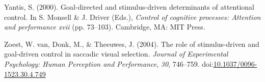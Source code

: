 \documentclass[jou, a4paper, noextraspace,floatsintext]{apa6}
\theoremstyle{definition}
\theoremstyle{definition}
\theoremstyle{definition}
\theoremstyle{remark}
\begin{document}
\hypertarget{ref-Yantis2000}{}
Yantis, S. (2000). Goal-directed and stimulus-driven determinants of
attentional control. In S. Monsell \& J. Driver (Eds.), \emph{Control of
cognitive processes: Attention and performance xvii} (pp. 73--103).
Cambridge, MA: MIT Press.

\hypertarget{ref-VanZoest2004}{}
Zoest, W. van, Donk, M., \& Theeuwes, J. (2004). The role of
stimulus-driven and goal-driven control in saccadic visual selection.
\emph{Journal of Experimental Psychology: Human Perception and
Performance}, \emph{30}, 746--759.
doi:\href{https://doi.org/10.1037/0096-1523.30.4.749}{10.1037/0096-1523.30.4.749}

\endgroup
\end{document}
